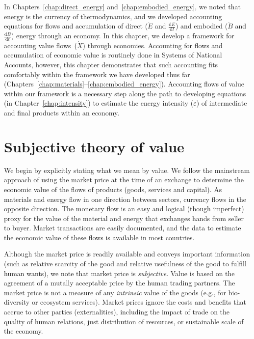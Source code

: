 In Chapters~\ref{chap:direct_energy} and~\ref{chap:embodied_energy}, 
we noted that energy is the currency of thermodynamics,
and we developed accounting equations for flows and accumulation of 
direct ($\dot{E}$ and $\frac{\mathrm{d}E}{\mathrm{d}t}$) 
and embodied ($\dot{B}$ and $\frac{\mathrm{d}B}{\mathrm{d}t}$) 
energy through an economy.
In this chapter, we develop a framework for accounting
value flows~($\dot{X}$) through economies.
Accounting for flows and accumulation of economic value is 
routinely done in Systems of National Accounts,
however, this chapter demonstrates that such accounting
fits comfortably within the framework we have developed thus far
(Chapters~\ref{chap:materials}--\ref{chap:embodied_energy}).
Accounting flows of value within our framework is a necessary step along
the path to developing equations (in Chapter~\ref{chap:intensity}) 
to estimate the energy intensity ($\varepsilon$) of intermediate
and final products within an economy.


\section{Subjective theory of value}
\label{sec:theory_of_value}


We begin by explicitly stating what we mean by value. 
We follow the mainstream approach 
of using the market price at the time of an exchange
to determine the economic value of the flows of products (goods, services and capital). 
As materials and energy flow in one direction between sectors, 
currency flows in the opposite direction. 
The monetary flow is an easy and logical (though imperfect)
proxy for the value of the material and energy that exchanges hands from seller to buyer. 
Market transactions are easily documented, 
and the data 
to estimate the economic value of these flows 
is available in most countries.\cite{IIOA-Data}

Although the market price is readily available and conveys important information (such as
relative scarcity of the good and relative usefulness of the good to fulfill human wants), we note that market
price is \emph{subjective}.  
Value is based on the agreement of a mutally acceptable price 
by the human trading partners. 
The market price
is not a measure of any \emph{intrinsic}
value of the goods (e.g., for bio-diversity or ecosystem services). 
Market prices ignore the costs and benefits that accrue 
to other parties (externalities), 
including the impact of trade on the quality of human relations, 
just distribution of resources, 
or sustainable scale of the economy.\cite[p.~55]{Daly1997} 

